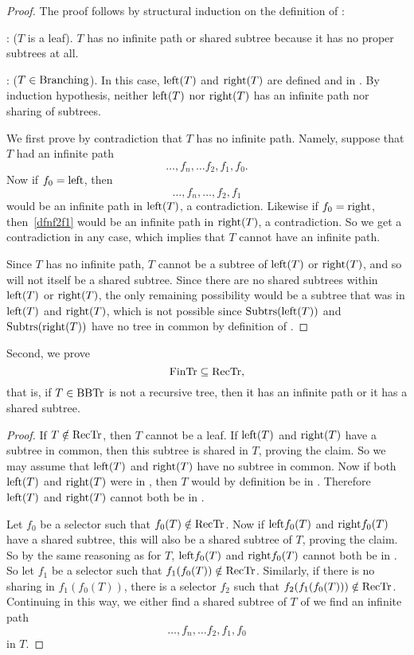 \begin{proof}
The proof follows by structural induction on the
definition of \rectr:

: ($T$ is a leaf).  $T$ has no infinite path
or shared subtree because it has no proper subtrees at all.

: ($T \in \text{Branching}$).  In this case,
$\text{left}(T)$ and $\text{right}(T)$ are defined and in \rectr.  By
induction hypothesis, neither $\text{left}(T)$ nor $\text{right}(T)$ has an
infinite path nor sharing of subtrees.

We first prove by contradiction that $T$ has no infinite path.
Namely, suppose that $T$ had an infinite path
\[
\dots,f_n,\dots f_2,f_1,f_0.
\]
Now if $f_0 = \leftsub$, then
\begin{equation}\label{dfnf2f1}
\dots,f_n,\dots,f_2,f_1
\end{equation}
would be an infinite path in $\text{left}(T)$, a contradiction.  Likewise
if $f_0 = \rightsub$, then~\eqref{dfnf2f1} would be an infinite path
in $\text{right}(T)$, a contradiction.  So we get a contradiction in any
case, which implies that $T$ cannot have an infinite path.

Since $T$ has no infinite path, $T$ cannot be a subtree of
$\text{left}(T)$ or $\text{right}(T)$, and so will not itself be a
shared subtree.  Since there are no shared subtrees within
$\text{left}(T)$ or $\text{right}(T)$, the only remaining possibility
would be a subtree that was in $\text{left}(T)$ and $\text{right}(T)$,
which is not possible since $\text{Subtrs}(\text{left}(T))$ and
$\text{Subtrs}(\text{right}(T))$ have no tree in common by definition of
\rectr.
\end{proof}

Second, we prove
\begin{equation}\label{fintrsubrectr}
\text{FinTr} \subseteq \text{RecTr},
\end{equation}
that is, if $T \in \text{BBTr}$ is not a recursive tree, then it has an
infinite path or it has a shared subtree.

\begin{proof}
If $T \notin \text{RecTr}$, then $T$ cannot be a leaf.  If $\text{left}(T)$
and $\text{right}(T)$ have a subtree in common, then this subtree is
shared in $T$, proving the claim.  So we may assume that
$\text{left}(T)$ and $\text{right}(T)$ have no subtree in common.  Now
if both $\text{left}(T)$ and $\text{right}(T)$ were in \rectr, then $T$
would by definition be in \rectr.  Therefore $\text{left}(T)$ and $\text{right}(T)$
cannot both be in \rectr.

Let $f_0$ be a selector such that $f_0(T) \notin \text{RecTr}$.  Now if
$\text{left}f_0(T)$ and $\text{right}f_0(T)$ have a shared subtree, this
will also be a shared subtree of $T$, proving the claim.  So by the
same reasoning as for $T$, $\text{left}f_0(T)$ and $\text{right}f_0(T)$
cannot both be in \rectr.  So let $f_1$ be a selector such that
$f_1(f_0(T)) \notin \text{RecTr}$.  Similarly, if there is no sharing in
$f_1(f_0(T))$, there is a selector $f_2$ such that $f_2(f_1(f_0(T)))
\notin \text{RecTr}$.  Continuing in this way, we either find a shared subtree of $T$ of we
find an infinite path
\[
\dots,f_n,\dots f_2,f_1,f_0
\]
in $T$.
\end{proof}

